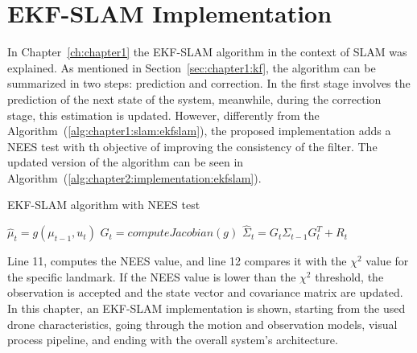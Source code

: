 \chapter{EKF-SLAM Implementation}
\label{ch:chapter2}
In Chapter~\ref{ch:chapter1} the EKF-SLAM algorithm in the context of \ac{SLAM} was explained. As mentioned in Section~\ref{sec:chapter1:kf}, the algorithm can be summarized in two steps: prediction and correction. In the first stage involves the prediction of the next state of the system, meanwhile, during the correction stage, this estimation is updated. However, differently from the Algorithm~(\ref{alg:chapter1:slam:ekfslam}), the proposed implementation adds a \ac{NEES} test with th objective of improving the consistency of the filter. The updated version of the algorithm can be seen in Algorithm~(\ref{alg:chapter2:implementation:ekfslam}).\\
\begin{algorithm}[h]
    \caption{EKF-SLAM algorithm with NEES test}
    \label{alg:chapter2:implementation:ekfslam}
    \BlankLine
    \BlankLine
    $\hat\mu_t = g\left(\mu_{t-1}, u_t\right)$\;
    $G_t = computeJacobian\left(g\right)$\;
    $\hat\Sigma_t = G_t \Sigma_{t-1} G_t^T + R_t$\;
    \BlankLine
    \BlankLine
\end{algorithm}

Line 11, computes the \ac{NEES} value, and line 12 compares it with the $\chi^2$ value for the specific landmark. If the \ac{NEES} value is lower than the $\chi^2$ threshold, the observation is accepted and the state vector and covariance matrix are updated.\\

In this chapter, an EKF-SLAM implementation is shown, starting from the used drone characteristics, going through the motion and observation models, visual process pipeline, and ending with the overall system's architecture.

